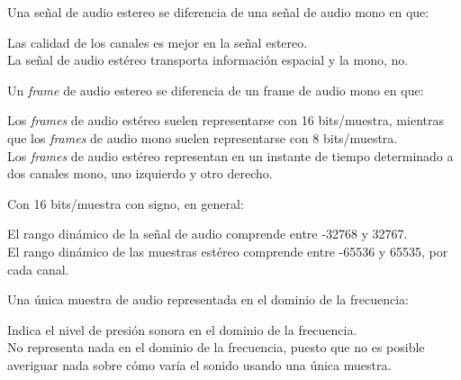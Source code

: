 \documentclass[legalpaper, 12pt, addpoints]{exam}
\begin{document}
\begin{questions}
\vspace{0.10in}

\question Una señal de audio estereo se diferencia de una señal de audio mono en que:

\begin{oneparchoices}
  \choice Las calidad de los canales es mejor en la señal estereo.\\
  \choice La señal de audio estéreo transporta información espacial y la mono, no.
\end{oneparchoices}
  
\vspace{0.10in}

\question Un \emph{frame} de audio estereo se diferencia de un frame
de audio mono en que:

\begin{oneparchoices}
  \choice Los \emph{frames} de audio estéreo suelen representarse con
  16 bits/muestra,
  mientras que los \emph{frames} de audio mono suelen representarse con 8 bits/muestra.\\
  \choice Los \emph{frames} de audio estéreo representan en un
  instante de tiempo determinado a dos canales mono, uno izquierdo y
  otro derecho.
\end{oneparchoices}
  
\vspace{0.10in}

\question Con 16 bits/muestra con signo, en general:

\begin{oneparchoices}
  \choice El rango dinámico de la señal de audio comprende entre -32768 y 32767.\\
  \choice El rango dinámico de las muestras estéreo comprende entre -65536 y 65535, por cada canal.
\end{oneparchoices}
  
\vspace{0.10in}

\question Una única muestra de audio representada en el dominio de la frecuencia:

\begin{oneparchoices}
  \choice Indica el nivel de presión sonora en el dominio de la frecuencia.\\
  \choice No representa nada en el dominio de la frecuencia, puesto
  que no es posible averiguar nada sobre cómo varía el sonido usando
  una única muestra.
\end{oneparchoices}
  
\vspace{0.10in}


\end{questions}
\end{document}
